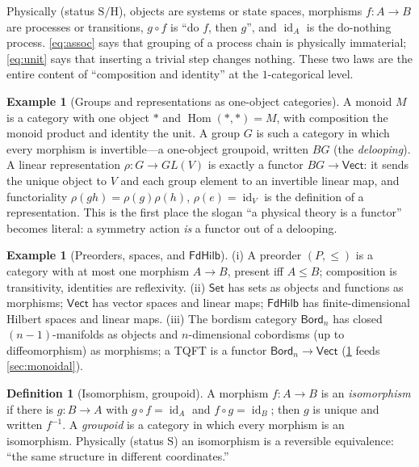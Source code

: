 \documentclass[12pt]{article}
\theoremstyle{definition}
\newtheorem{definition}[theorem]{Definition}
\newtheorem{example}[theorem]{Example}
\theoremstyle{remark}
\newcommand{\Set}{\mathsf{Set}}
\newcommand{\Vect}{\mathsf{Vect}}
\newcommand{\FdHilb}{\mathsf{FdHilb}}
\newcommand{\Bord}{\mathsf{Bord}}
\newcommand{\Hom}{\operatorname{Hom}}
\newcommand{\id}{\operatorname{id}}
\begin{document}
Physically (status $\mathrm{S/H}$), objects are systems or state spaces,
morphisms $f:A\to B$ are processes or transitions, $g\circ f$ is ``do $f$, then
$g$'', and $\id_A$ is the do-nothing process. \eqref{eq:assoc} says that grouping
of a process chain is physically immaterial; \eqref{eq:unit} says that inserting
a trivial step changes nothing. These two laws are the entire content of
``composition and identity'' at the $1$-categorical level.

\begin{example}[Groups and representations as one-object categories]
\label{ex:BG}
A monoid $M$ is a category with one object $\ast$ and $\Hom(\ast,\ast)=M$, with
composition the monoid product and identity the unit. A group $G$ is such a
category in which every morphism is invertible---a one-object groupoid, written
$BG$ (the \emph{delooping}). A linear representation $\rho:G\to GL(V)$ is exactly
a functor $BG\to\Vect$: it sends the unique object to $V$ and each group element
to an invertible linear map, and functoriality $\rho(gh)=\rho(g)\rho(h)$,
$\rho(e)=\id_V$ is the definition of a representation. This is the first place
the slogan ``a physical theory is a functor'' becomes literal: a symmetry action
\emph{is} a functor out of a delooping.
\end{example}

\begin{example}[Preorders, spaces, and $\FdHilb$]
\label{ex:examples}
(i) A preorder $(P,\le)$ is a category with at most one morphism $A\to B$,
present iff $A\le B$; composition is transitivity, identities are reflexivity.
(ii) $\Set$ has sets as objects and functions as morphisms; $\Vect$ has vector
spaces and linear maps; $\FdHilb$ has finite-dimensional Hilbert spaces and
linear maps. (iii) The bordism category $\Bord_n$ has closed $(n{-}1)$-manifolds
as objects and $n$-dimensional cobordisms (up to diffeomorphism) as morphisms; a
TQFT is a functor $\Bord_n\to\Vect$ (\cref{ex:examples} feeds
\cref{sec:monoidal}).
\end{example}

\begin{definition}[Isomorphism, groupoid]
A morphism $f:A\to B$ is an \emph{isomorphism} if there is $g:B\to A$ with
$g\circ f=\id_A$ and $f\circ g=\id_B$; then $g$ is unique and written $f^{-1}$. A
\emph{groupoid} is a category in which every morphism is an isomorphism.
Physically (status $\mathrm{S}$) an isomorphism is a reversible equivalence:
``the same structure in different coordinates.''
\end{definition}
\end{document}
